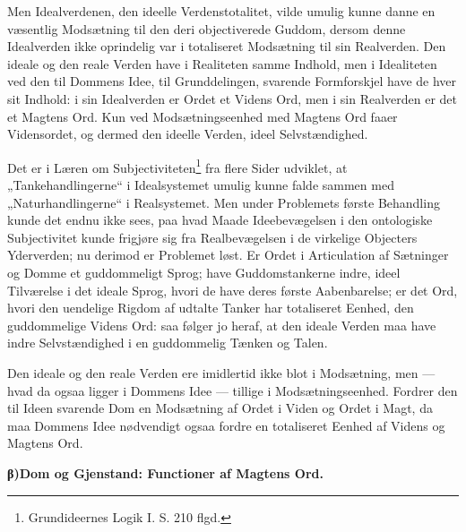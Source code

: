 \documentclass[12pt]{book}
\newcommand{\opage}[1]{\marginnote{\footnotesize\textit{[#1]}}}
\begin{document}
Men Idealverdenen, den ideelle Verdenstotalitet, vilde
umulig kunne danne en væsentlig Modsætning til den deri
objectiverede Guddom, dersom denne Idealverden ikke oprindelig
var i totaliseret Modsætning til sin Realverden. Den
ideale og den reale Verden have i Realiteten samme Indhold,
men i Idealiteten ved den til Dommens Idee, til
Grunddelingen, svarende Formforskjel have de hver sit Indhold:
i sin Idealverden er Ordet et Videns Ord, men i sin
Realverden er det et Magtens Ord. Kun ved Modsætningseenhed
med Magtens Ord faaer Vidensordet, og dermed den
ideelle Verden, ideel Selvstændighed.

Det er i Læren om Subjectiviteten\footnote{Grundideernes Logik I. S. 210 flgd.} %
fra flere Sider
udviklet, at „Tankehandlingerne“ i Idealsystemet umulig kunne
falde sammen med „Naturhandlingerne“ i Realsystemet. Men
under Problemets første Behandling kunde det endnu ikke sees,
\opage{95}paa hvad Maade Ideebevægelsen i den ontologiske Subjectivitet
kunde frigjøre sig fra Realbevægelsen i de virkelige Objecters
Yderverden; nu derimod er Problemet løst. Er Ordet i Articulation
af Sætninger og Domme et guddommeligt Sprog;
have Guddomstankerne indre, ideel Tilværelse i det ideale
Sprog, hvori de have deres første Aabenbarelse; er det Ord,
hvori den uendelige Rigdom af udtalte Tanker har totaliseret
Eenhed, den guddommelige Videns Ord: saa følger jo heraf,
at den ideale Verden maa have indre Selvstændighed i en guddommelig
Tænken og Talen.

Den ideale og den reale Verden ere imidlertid ikke blot
i Modsætning, men --- hvad da ogsaa ligger i Dommens Idee ---
tillige i Modsætningseenhed. Fordrer den til Ideen svarende
Dom en Modsætning af Ordet i Viden og Ordet i Magt,
da maa Dommens Idee nødvendigt ogsaa fordre en totaliseret
Eenhed af Videns og Magtens Ord.

\begin{center}{\bfseries β)\quad Dom og Gjenstand: Functioner af Magtens Ord.}\end{center}
\end{document}
